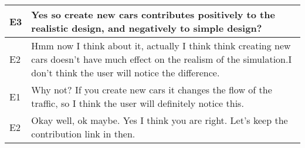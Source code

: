 \begin{tabular}{|p{10mm}|p{140mm}|}
\hline
E3 & Yes so create new cars contributes positively to the realistic design, and negatively to simple design?\\
\hline
E2 & Hmm now I think about it, actually I think think creating new cars doesn't have much effect on the realism of the simulation.I don't think the user will notice the difference.\\
\hline
E1 & Why not? If you create new cars it changes the flow of the traffic, so I think the user will definitely notice this.\\
\hline
E2 & Okay well, ok maybe. Yes I think you are right. Let's keep the contribution link in then.\\
\hline
\end{tabular}
